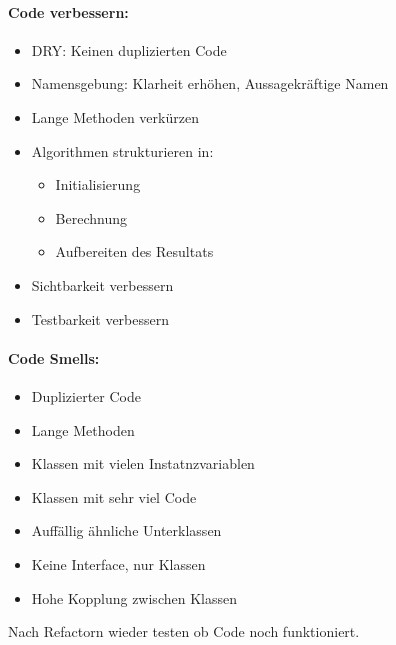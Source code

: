 \documentclass[../ZF_SWEN1.tex]{subfiles}
\begin{document}
\paragraph{Code verbessern:}
\begin{itemize}
	\item DRY: Keinen duplizierten Code
	\item Namensgebung: Klarheit erhöhen, Aussagekräftige Namen
	\item Lange Methoden verkürzen
	\item Algorithmen strukturieren in:
	\begin{itemize}
		\item Initialisierung
		\item Berechnung
		\item Aufbereiten des Resultats
	\end{itemize}
	\item Sichtbarkeit verbessern
	\item Testbarkeit verbessern
\end{itemize}


\paragraph{Code Smells:}
\begin{itemize}
	\item Duplizierter Code
	\item Lange Methoden
	\item Klassen mit vielen Instatnzvariablen
	\item Klassen mit sehr viel Code
	\item Auffällig ähnliche Unterklassen
	\item Keine Interface, nur Klassen
	\item Hohe Kopplung zwischen Klassen
\end{itemize}


Nach Refactorn wieder testen ob Code noch funktioniert.
\end{document}
